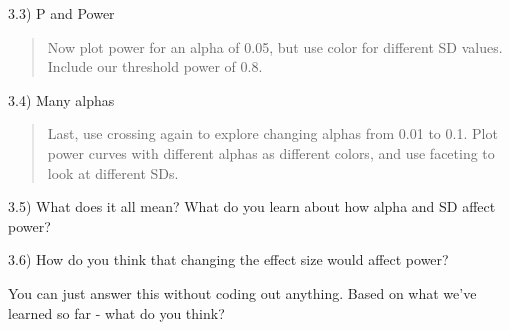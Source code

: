 \documentclass[ignorenonframetext,]{beamer}
\begin{document}
\begin{frame}{3.3) P and Power}

\begin{quote}
Now plot power for an alpha of 0.05, but use color for different SD
values. Include our threshold power of 0.8.
\end{quote}

\end{frame}

\begin{frame}{3.4) Many alphas}

\begin{quote}
Last, use crossing again to explore changing alphas from 0.01 to 0.1.
Plot power curves with different alphas as different colors, and use
faceting to look at different SDs.
\end{quote}

\end{frame}

\begin{frame}{3.5) What does it all mean? What do you learn about how
alpha and SD affect power?}

\end{frame}

\begin{frame}{3.6) How do you think that changing the effect size would
affect power?}

\end{frame}

\begin{frame}{You can just answer this without coding out anything.
Based on what we've learned so far - what do you think?}

\end{frame}
\end{document}
